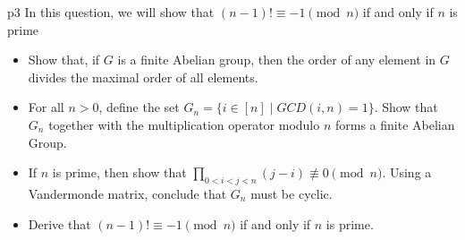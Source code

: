 \documentclass[a4paper, 11pt]{article}
\newcounter{problem}
\begin{document}
\begin{problem}{%
	}{p3%
	}
In this question, we will show that $(n-1)!\equiv -1\pmod{n}$ if and only if $n$ is  prime
\begin{itemize}
	\item Show that, if $G$ is a finite Abelian group, then the order of any element in $G$ divides the maximal order of all elements.
	\item For all $n>0$, define the set $G_n=\{i\in [n]\mid GCD(i,n)=1\}$. Show that $G_n$ together with the multiplication operator modulo $n$ forms a finite Abelian Group.
	\item If $n$ is prime, then show that $\prod_{0<i<j<n}(j-i)\not\equiv 0\pmod{n}$. Using a Vandermonde matrix, conclude that $G_n$ must be cyclic.
	\item Derive that $(n-1)!\equiv -1\pmod{n}$ if and only if $n$ is prime.
\end{itemize}
\end{problem}
\end{document}
